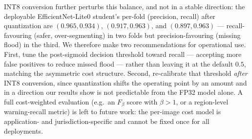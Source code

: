 INT8 conversion further perturbs this balance, and not in a stable direction: the deployable EfficientNet-Lite0 student's per-fold (precision, recall) after quantization are $(0.965, 0.934)$, $(0.917, 0.963)$, and $(0.897, 0.963)$ --- recall-favouring (safer, over-segmenting) in two folds but precision-favouring (missing flood) in the third. We therefore make two recommendations for operational use. First, tune the post-sigmoid decision threshold toward recall --- accepting more false positives to reduce missed flood --- rather than leaving it at the default $0.5$, matching the asymmetric cost structure. Second, re-calibrate that threshold \emph{after} INT8 conversion, since quantization shifts the operating point by an amount and in a direction our results show is not predictable from the FP32 model alone. A full cost-weighted evaluation (e.g.\ an $F_\beta$ score with $\beta>1$, or a region-level warning-recall metric) is left to future work: the per-image cost model is application- and jurisdiction-specific and cannot be fixed once for all deployments.
